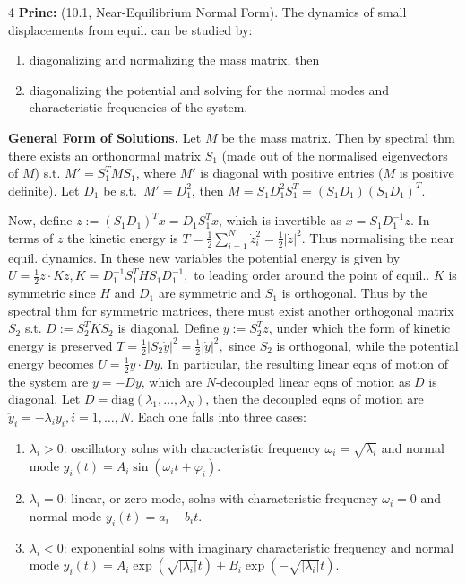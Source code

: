 \documentclass[landscape, 8pt]{extarticle}
\begin{document}
\begin{multicols*}{4}
		\textbf{Princ:} (10.1, Near-Equilibrium Normal Form). The dynamics of small displacements from equil. can be studied by:
		\begin{enumerate}[leftmargin=*,topsep=0pt,itemsep=0pt]
			\item diagonalizing and normalizing the mass matrix, then
			\item diagonalizing the potential and solving for the normal modes and characteristic frequencies of the system.
		\end{enumerate}
		
		\textbf{General Form of Solutions.} Let $M$ be the mass matrix. Then by spectral thm there exists an orthonormal matrix $S_1$ (made out of the normalised eigenvectors of $M$) s.t. $M'=S_1^T MS_1$, where $M'$ is diagonal with positive entries ($M$ is positive definite). Let $D_1$ be s.t.\ $M'=D_1^2$, then $M=S_1D_1^2S_1^T=(S_1D_1)(S_1D_1)^T$.
		
		Now, define $z:=(S_1D_1)^Tx=D_1S_1^Tx$, which is invertible as $x=S_1D_1^{-1}z$. In terms of $z$ the kinetic energy is
		$
		T=\frac{1}{2}\sum_{i=1}^N\dot{z}_i^2=\frac{1}{2}|\dot{z}|^2.
		$
		Thus normalising the near equil. dynamics. In these new variables the potential energy is given by
		$
		U=\frac{1}{2}z\cdot Kz, K=D_1^{-1}S_1^T HS_1D_1^{-1},
		$
		to leading order around the point of equil.. $K$ is symmetric since $H$ and $D_1$ are symmetric and $S_1$ is orthogonal. Thus by the spectral thm for symmetric matrices, there must exist another orthogonal matrix $S_2$ s.t. $D:=S_2^T KS_2$ is diagonal. Define $y:=S_2^Tz$, under which the form of kinetic energy is preserved
		$
		T=\frac{1}{2}|S_2\dot{y}|^2=\frac{1}{2}|\dot{y}|^2,
		$
		since $S_2$ is orthogonal, while the potential energy becomes
		$
		U=\frac{1}{2}y\cdot Dy.
		$
		In particular, the resulting linear eqns of motion of the system are $\ddot{y}=-Dy$, which are $N$-decoupled linear eqns of motion as $D$ is diagonal. Let $D=\mathrm{diag}(\lambda_1,\ldots,\lambda_N)$, then the decoupled eqns of motion are
		$
		\ddot{y}_i=-\lambda_i y_i, i=1,\ldots,N.
		$
		Each one falls into three cases:
		\begin{enumerate}[leftmargin=*,topsep=0pt,itemsep=0pt]
			\item $\lambda_i>0$: oscillatory solns with characteristic frequency $\omega_i=\sqrt{\lambda_i}$ and normal mode $y_i(t)=A_i\sin(\omega_i t+\varphi_i)$.
			\item $\lambda_i=0$: linear, or zero-mode, solns with characteristic frequency $\omega_i=0$ and normal mode $y_i(t)=a_i+b_it$.
			\item $\lambda_i<0$: exponential solns with imaginary characteristic frequency and normal mode $y_i(t)=A_i\exp\!\left(\sqrt{|\lambda_i|}t\right)+B_i\exp\!\left(-\sqrt{|\lambda_i|}t\right)$.
		\end{enumerate}
		

\end{multicols*}
\end{document}
